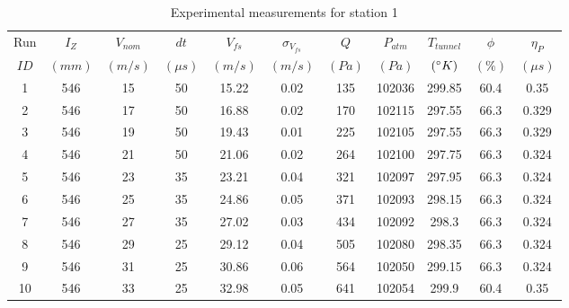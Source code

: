 \begin{table}[H]
\begin{center}
\begin{tabular}{|ccccccccccc|}
	\hline
	Run & $I_Z$ & $V_{nom}$ & $dt$ & $V_{fs}$ & $\sigma_{V_{fs}}$ & $Q$ & $P_{atm}$ & $T_{tunnel}$ & $\phi$ & $\eta_P$\\
	$ID$ & $(mm)$ & $(m/s)$ & $(\mu s)$ & $(m/s)$ & $(m/s)$ & $(Pa)$ & $(Pa)$ & $(\degree K)$ & $(\%)$ & $(\mu s)$\\
	\hline
	1 & 546 & 15 & 50 & 15.22 & 0.02 & 135 & 102036 & 299.85 & 60.4 & 0.35\\
	2 & 546 & 17 & 50 & 16.88 & 0.02 & 170 & 102115 & 297.55 & 66.3 & 0.329\\
	3 & 546 & 19 & 50 & 19.43 & 0.01 & 225 & 102105 & 297.55 & 66.3 & 0.329\\
	4 & 546 & 21 & 50 & 21.06 & 0.02 & 264 & 102100 & 297.75 & 66.3 & 0.324\\
	5 & 546 & 23 & 35 & 23.21 & 0.04 & 321 & 102097 & 297.95 & 66.3 & 0.324\\
	6 & 546 & 25 & 35 & 24.86 & 0.05 & 371 & 102093 & 298.15 & 66.3 & 0.324\\
	7 & 546 & 27 & 35 & 27.02 & 0.03 & 434 & 102092 & 298.3 & 66.3 & 0.324\\
	8 & 546 & 29 & 25 & 29.12 & 0.04 & 505 & 102080 & 298.35 & 66.3 & 0.324\\
	9 & 546 & 31 & 25 & 30.86 & 0.06 & 564 & 102050 & 299.15 & 66.3 & 0.324\\
	10 & 546 & 33 & 25 & 32.98 & 0.05 & 641 & 102054 & 299.9 & 60.4 & 0.35\\
	\hline
\end{tabular}
\caption{Experimental measurements for station 1}
\label{table:station_1_measurements}
\end{center}
\end{table}
